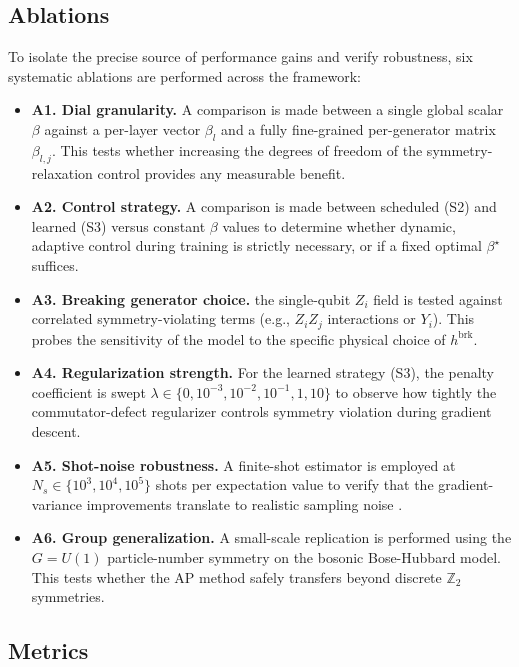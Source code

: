 \documentclass[10pt,twocolumn]{article}
\theoremstyle{remark}
\begin{document}
\subsection{Ablations}

To isolate the precise source of performance gains and verify robustness, six systematic ablations are performed across the framework:
\begin{itemize}
    \item \textbf{A1. Dial granularity.} A comparison is made between a single global scalar $\beta$ against a per-layer vector $\beta_l$ and a fully fine-grained per-generator matrix $\beta_{l,j}$. This tests whether increasing the degrees of freedom of the symmetry-relaxation control provides any measurable benefit.
    \item \textbf{A2. Control strategy.} A comparison is made between scheduled (S2) and learned (S3) versus constant $\beta$ values to determine whether dynamic, adaptive control during training is strictly necessary, or if a fixed optimal $\beta^\star$ suffices.
    \item \textbf{A3. Breaking generator choice.} the single-qubit $Z_i$ field is tested against correlated symmetry-violating terms (e.g., $Z_iZ_j$ interactions or $Y_i$). This probes the sensitivity of the model to the specific physical choice of $h^{\text{brk}}$.
    \item \textbf{A4. Regularization strength.} For the learned strategy (S3), the penalty coefficient is swept $\lambda \in \{0, 10^{-3}, 10^{-2}, 10^{-1}, 1, 10\}$ to observe how tightly the commutator-defect regularizer controls symmetry violation during gradient descent.
    \item \textbf{A5. Shot-noise robustness.} A finite-shot estimator is employed at $N_s \in \{10^3, 10^4, 10^5\}$ shots per expectation value to verify that the gradient-variance improvements translate to realistic sampling noise \cite{wang2021noise}.
    \item \textbf{A6. Group generalization.} A small-scale replication is performed using the $G = U(1)$ particle-number symmetry on the bosonic Bose-Hubbard model. This tests whether the AP method safely transfers beyond discrete $\mathbb{Z}_2$ symmetries.
\end{itemize}

\subsection{Metrics}
\end{document}
